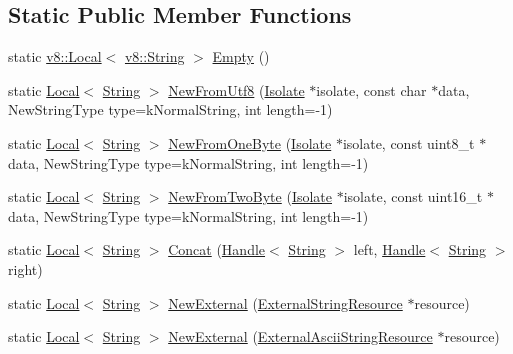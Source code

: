\subsection*{Static Public Member Functions}
\begin{DoxyCompactItemize}
\item 
static \hyperlink{classv8_1_1_local}{v8\+::\+Local}$<$ \hyperlink{classv8_1_1_string}{v8\+::\+String} $>$ \hyperlink{classv8_1_1_string_a5f222b35243cdfc0bb2c12a300d62d11}{Empty} ()
\item 
static \hyperlink{classv8_1_1_local}{Local}$<$ \hyperlink{classv8_1_1_string}{String} $>$ \hyperlink{classv8_1_1_string_aa4b8c052f5108ca6350c45922602b9d4}{New\+From\+Utf8} (\hyperlink{classv8_1_1_isolate}{Isolate} $\ast$isolate, const char $\ast$data, New\+String\+Type type=k\+Normal\+String, int length=-\/1)
\item 
static \hyperlink{classv8_1_1_local}{Local}$<$ \hyperlink{classv8_1_1_string}{String} $>$ \hyperlink{classv8_1_1_string_afa8026ed1337564a9fd15dc56aceaa83}{New\+From\+One\+Byte} (\hyperlink{classv8_1_1_isolate}{Isolate} $\ast$isolate, const uint8\+\_\+t $\ast$data, New\+String\+Type type=k\+Normal\+String, int length=-\/1)
\item 
static \hyperlink{classv8_1_1_local}{Local}$<$ \hyperlink{classv8_1_1_string}{String} $>$ \hyperlink{classv8_1_1_string_a876615eb027092a6a71a4e7d69b82d00}{New\+From\+Two\+Byte} (\hyperlink{classv8_1_1_isolate}{Isolate} $\ast$isolate, const uint16\+\_\+t $\ast$data, New\+String\+Type type=k\+Normal\+String, int length=-\/1)
\item 
static \hyperlink{classv8_1_1_local}{Local}$<$ \hyperlink{classv8_1_1_string}{String} $>$ \hyperlink{classv8_1_1_string_a3d0b9c9208cf5054adb048e360fb73ff}{Concat} (\hyperlink{classv8_1_1_handle}{Handle}$<$ \hyperlink{classv8_1_1_string}{String} $>$ left, \hyperlink{classv8_1_1_handle}{Handle}$<$ \hyperlink{classv8_1_1_string}{String} $>$ right)
\item 
static \hyperlink{classv8_1_1_local}{Local}$<$ \hyperlink{classv8_1_1_string}{String} $>$ \hyperlink{classv8_1_1_string_a5b98a12b3c09f22597d2ff3f9c9f2f2d}{New\+External} (\hyperlink{classv8_1_1_string_1_1_external_string_resource}{External\+String\+Resource} $\ast$resource)
\item 
static \hyperlink{classv8_1_1_local}{Local}$<$ \hyperlink{classv8_1_1_string}{String} $>$ \hyperlink{classv8_1_1_string_adbcec9a915fabf0235f4f688cd7b4f32}{New\+External} (\hyperlink{classv8_1_1_string_1_1_external_ascii_string_resource}{External\+Ascii\+String\+Resource} $\ast$resource)
\end{DoxyCompactItemize}


